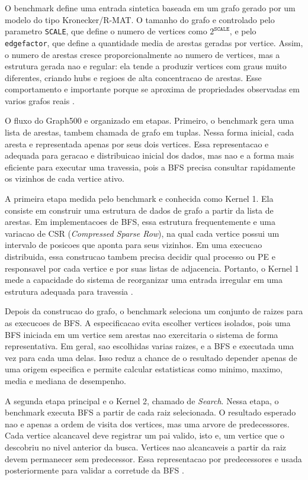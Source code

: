 \documentclass{article}
\begin{document}
O benchmark define uma entrada sintetica baseada em um grafo gerado por um
modelo do tipo Kronecker/R-MAT. O tamanho do grafo e controlado pelo parametro
\texttt{SCALE}, que define o numero de vertices como $2^{\texttt{SCALE}}$, e
pelo \texttt{edgefactor}, que define a quantidade media de arestas geradas por
vertice. Assim, o numero de arestas cresce proporcionalmente ao numero de
vertices, mas a estrutura gerada nao e regular: ela tende a produzir vertices
com graus muito diferentes, criando hubs e regioes de alta concentracao de
arestas. Esse comportamento e importante porque se aproxima de propriedades
observadas em varios grafos reais \cite{graph500spec}.

O fluxo do Graph500 e organizado em etapas. Primeiro, o benchmark gera uma lista
de arestas, tambem chamada de grafo em tuplas. Nessa forma inicial, cada aresta
e representada apenas por seus dois vertices. Essa representacao e adequada para
geracao e distribuicao inicial dos dados, mas nao e a forma mais eficiente para
executar uma travessia, pois a BFS precisa consultar rapidamente os vizinhos de
cada vertice ativo.

A primeira etapa medida pelo benchmark e conhecida como Kernel 1. Ela consiste
em construir uma estrutura de dados de grafo a partir da lista de arestas. Em
implementacoes de BFS, essa estrutura frequentemente e uma variacao de CSR
(\textit{Compressed Sparse Row}), na qual cada vertice possui um intervalo de
posicoes que aponta para seus vizinhos. Em uma execucao distribuida, essa
construcao tambem precisa decidir qual processo ou PE e responsavel por cada
vertice e por suas listas de adjacencia. Portanto, o Kernel 1 mede a capacidade
do sistema de reorganizar uma entrada irregular em uma estrutura adequada para
travessia \cite{graph500spec}.

Depois da construcao do grafo, o benchmark seleciona um conjunto de raizes para
as execucoes de BFS. A especificacao evita escolher vertices isolados, pois uma
BFS iniciada em um vertice sem arestas nao exercitaria o sistema de forma
representativa. Em geral, sao escolhidas varias raizes, e a BFS e executada uma
vez para cada uma delas. Isso reduz a chance de o resultado depender apenas de
uma origem especifica e permite calcular estatisticas como minimo, maximo, media
e mediana de desempenho.

A segunda etapa principal e o Kernel 2, chamado de \textit{Search}. Nessa etapa,
o benchmark executa BFS a partir de cada raiz selecionada. O resultado esperado
nao e apenas a ordem de visita dos vertices, mas uma arvore de predecessores.
Cada vertice alcancavel deve registrar um pai valido, isto e, um vertice que o
descobriu no nivel anterior da busca. Vertices nao alcancaveis a partir da raiz
devem permanecer sem predecessor. Essa representacao por predecessores e usada
posteriormente para validar a corretude da BFS \cite{graph500spec}.
\end{document}
